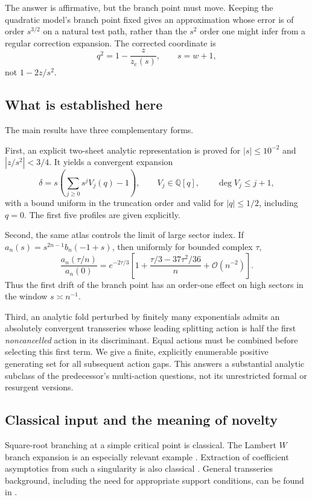 \documentclass[11pt,a4paper]{article}
\theoremstyle{definition}
\theoremstyle{remark}
\newcommand{\Q}{\mathbb Q}
\newcommand{\OO}{\mathcal O}
\newcommand{\zc}{z_{\mathrm c}}
\begin{document}
The answer is affirmative, but the branch point must move. Keeping the
quadratic model's branch point fixed gives an approximation whose error
is of order $s^{3/2}$ on a natural test path, rather than the $s^2$ order
one might infer from a regular correction expansion. The corrected
coordinate is
\begin{equation}\label{eq:intro-q}
 q^2=1-\frac{z}{\zc(s)},\qquad s=w+1,
\end{equation}
not $1-2z/s^2$.

\subsection{What is established here}
The main results have three complementary forms.

First, an explicit two-sheet analytic representation is proved for
$|s|\le 10^{-2}$ and $|z/s^2|<3/4$. It yields a convergent expansion
\[
 \delta=s\left(\sum_{j\ge0}s^jV_j(q)-1\right),
 \qquad V_j\in\Q[q],\qquad \deg V_j\le j+1,
\]
with a bound uniform in the truncation order and valid for $|q|\le1/2$,
including $q=0$. The first five profiles are given explicitly.

Second, the same atlas controls the limit of large sector index. If
$a_n(s)=s^{2n-1}b_n(-1+s)$, then uniformly for bounded complex $\tau$,
\begin{equation}\label{eq:intro-crossover}
 \frac{a_n(\tau/n)}{a_n(0)}
 =e^{-2\tau/3}
 \left[1+\frac{\tau/3-37\tau^2/36}{n}+\OO(n^{-2})\right].
\end{equation}
Thus the first drift of the branch point has an order-one effect on high
sectors in the window $s\asymp n^{-1}$.

Third, an analytic fold perturbed by finitely many exponentials admits an
absolutely convergent transseries whose leading splitting action is half
the first \emph{noncancelled} action in its discriminant. Equal actions
must be combined before selecting this first term. We give a finite,
explicitly enumerable positive generating set for all subsequent action
gaps. This answers a substantial analytic subclass of the predecessor's
multi-action questions, not its unrestricted formal or resurgent versions.

\subsection{Classical input and the meaning of novelty}
Square-root branching at a simple critical point is classical. The
Lambert $W$ branch expansion is an especially relevant example
\cite{corless}. Extraction of coefficient asymptotics from such a
singularity is also classical \cite{flajolet-odlyzko}. General transseries
background, including the need for appropriate support conditions, can
be found in \cite{edgar}.
\end{document}
